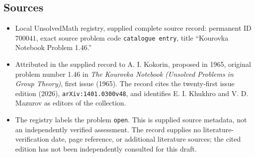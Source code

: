 \documentclass[11pt]{article}
\begin{document}
\subsection{Sources}
\begin{itemize}
\item Local UnsolvedMath registry, supplied complete source record: permanent ID \(700041\), exact source problem code \texttt{catalogue entry}, title ``Kourovka Notebook Problem 1.46.''
\item Attributed in the supplied record to A. I. Kokorin, proposed in 1965, original problem number 1.46 in \emph{The Kourovka Notebook (Unsolved Problems in Group Theory)}, first issue (1965). The record cites the twenty-first issue edition (2026), \texttt{arXiv:1401.0300v48}, and identifies E. I. Khukhro and V. D. Mazurov as editors of the collection.
\item The registry labels the problem \texttt{open}. This is supplied source metadata, not an independently verified assessment. The record supplies no literature-verification date, page reference, or additional literature sources; the cited edition has not been independently consulted for this draft.
\end{itemize}
\end{document}
